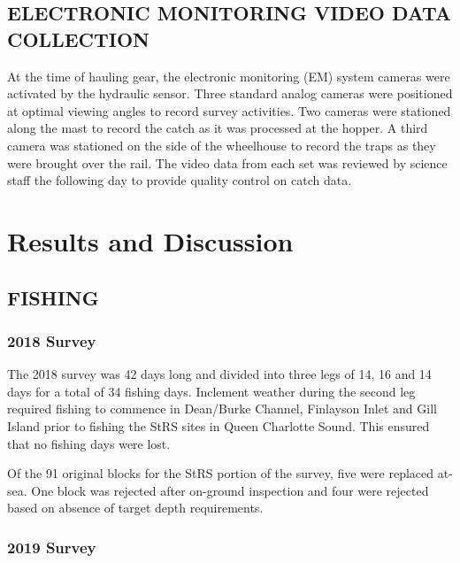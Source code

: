 \documentclass[12pt]{article}\usepackage[]{graphicx}\usepackage[]{color}
\begin{document}
\hypertarget{electronic-monitoring-video-data-collection}{%
\subsection{ELECTRONIC MONITORING VIDEO DATA COLLECTION}\label{electronic-monitoring-video-data-collection}}

At the time of hauling gear, the electronic monitoring (EM) system cameras were activated by the hydraulic sensor. Three standard analog cameras were positioned at optimal viewing angles to record survey activities. Two cameras were stationed along the mast to record the catch as it was processed at the hopper. A third camera was stationed on the side of the wheelhouse to record the traps as they were brought over the rail. The video data from each set was reviewed by science staff the following day to provide quality control on catch data.

\clearpage

\hypertarget{results-and-discussion}{%
\section{Results and Discussion}\label{results-and-discussion}}

\hypertarget{fishing}{%
\subsection{FISHING}\label{fishing}}

\hypertarget{survey}{%
\subsubsection{2018 Survey}\label{survey}}

The 2018 survey was 42 days long and divided into three legs of 14, 16 and 14 days for a total of 34 fishing days. Inclement weather during the second leg required fishing to commence in Dean/Burke Channel, Finlayson Inlet and Gill Island prior to fishing the StRS sites in Queen Charlotte Sound. This ensured that no fishing days were lost.

Of the 91 original blocks for the StRS portion of the survey, five were replaced at-sea. One block was rejected after on-ground inspection and four were rejected based on absence of target depth requirements.

\hypertarget{survey-1}{%
\subsubsection{2019 Survey}\label{survey-1}}
\end{document}
